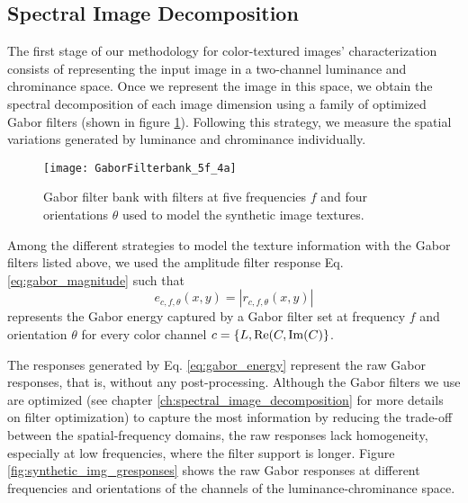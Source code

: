 \subsection{Spectral Image Decomposition}
 The first stage of our methodology for color-textured images' characterization consists of representing the input image in a two-channel luminance and chrominance space. Once we represent the image in this space, we obtain the spectral decomposition of each image dimension using a family of optimized Gabor filters (shown in figure \ref{fig:gabrfilter_5f_4a}). Following this strategy, we measure the spatial variations generated by luminance and chrominance individually. 

\begin{figure}[!ht]
    \centering
    \texttt{[image: GaborFilterbank\_5f\_4a]}
    \caption{Gabor filter bank with filters at five frequencies $f$ and four orientations $\theta$ used to model the synthetic image textures.}\label{fig:gabrfilter_5f_4a}    
\end{figure}

Among the different strategies to model the texture information with the Gabor filters listed above, we used the amplitude filter response Eq. \eqref{eq:gabor_magnitude} such that
\begin{equation}\label{eq:gabor_energy}
	e_{c, f, \theta}(x,y) = |r_{c, f, \theta}(x,y)|
\end{equation}
represents the Gabor energy captured by a Gabor filter set at frequency $f$ and orientation $\theta$ for every color channel  $c=\{L, \mathrm{Re}(C, \mathrm{Im}(C)\}$. 

The responses generated by Eq. \eqref{eq:gabor_energy} represent the raw Gabor responses, that is, without any post-processing. Although the Gabor filters we use are optimized (see chapter \ref{ch:spectral_image_decomposition} for more details on filter optimization) to capture the most information by reducing the trade-off between the spatial-frequency domains, the raw responses lack homogeneity, especially at low frequencies, where the filter support is longer. Figure \ref{fig:synthetic_img_gresponses} shows the raw Gabor responses at different frequencies and orientations of the channels of the luminance-chrominance space. 

